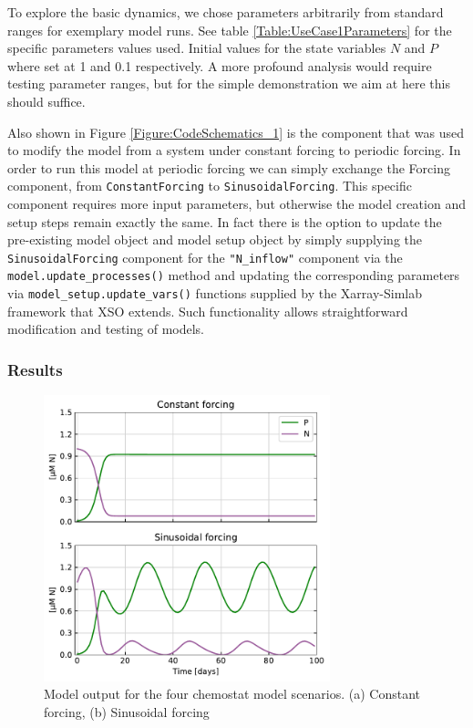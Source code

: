 \documentclass[journal abbreviation, manuscript]{copernicus}
\begin{document}
To explore the basic dynamics, we chose parameters arbitrarily from standard ranges for exemplary model runs. See table \ref{Table:UseCase1Parameters} for the specific parameters values used. Initial values for the state variables $N$ and $P$ where set at 1 and 0.1 respectively. A more profound analysis would require testing parameter ranges, but for the simple demonstration we aim at here this should suffice.

Also shown in Figure \ref{Figure:CodeSchematics_1} is the component that was used to modify the model from a system under constant forcing to periodic forcing. In order to run this model at periodic forcing we can simply exchange the Forcing component, from \texttt{ConstantForcing} to \texttt{SinusoidalForcing}. This specific component requires more input parameters, but otherwise the model creation and setup steps remain exactly the same. In fact there is the option to update the pre-existing model object and model setup object by simply supplying the \texttt{SinusoidalForcing} component for the \texttt{"N\_inflow"} component via the \texttt{model.update\_processes()} method and updating the corresponding parameters via \texttt{model\_setup.update\_vars()} functions supplied by the Xarray-Simlab framework that XSO extends. Such functionality allows straightforward modification and testing of models.

\subsubsection{Results}

\begin{figure}[t]
\includegraphics[width=8.3cm]{Figures/firstdraft_plots/01_chemostat_output.pdf}
\caption{Model output for the four chemostat model scenarios. (a) Constant forcing, (b) Sinusoidal forcing}
\label{Figure:ResultsChemostat}
\end{figure}
\end{document}
